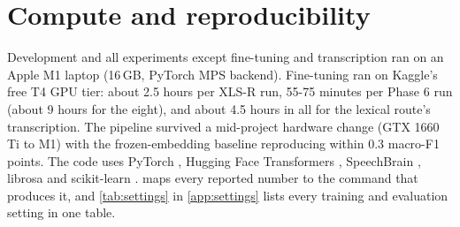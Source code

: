 \section{Compute and reproducibility}

Development and all experiments except fine-tuning and transcription ran on an
Apple M1 laptop (16\,GB, PyTorch MPS backend). Fine-tuning ran on Kaggle's free
T4 GPU tier: about 2.5 hours per XLS-R run, 55-75 minutes per Phase 6 run
(about 9 hours for the eight), and about 4.5 hours in all for the lexical
route's transcription. The pipeline survived a mid-project hardware change (GTX
1660 Ti to M1) with the frozen-embedding baseline reproducing within 0.3
macro-F1 points. The code uses PyTorch \cite{Paszke2019PyTorch}, Hugging Face
Transformers \cite{Wolf2020Transformers}, SpeechBrain
\cite{Ravanelli2021SpeechBrain}, librosa \cite{McFee2015librosa} and
scikit-learn \cite{Pedregosa2011Scikit}.  maps every reported
number to the command that produces it, and \cref{tab:settings} in
\cref{app:settings} lists every training and evaluation setting in one table.
